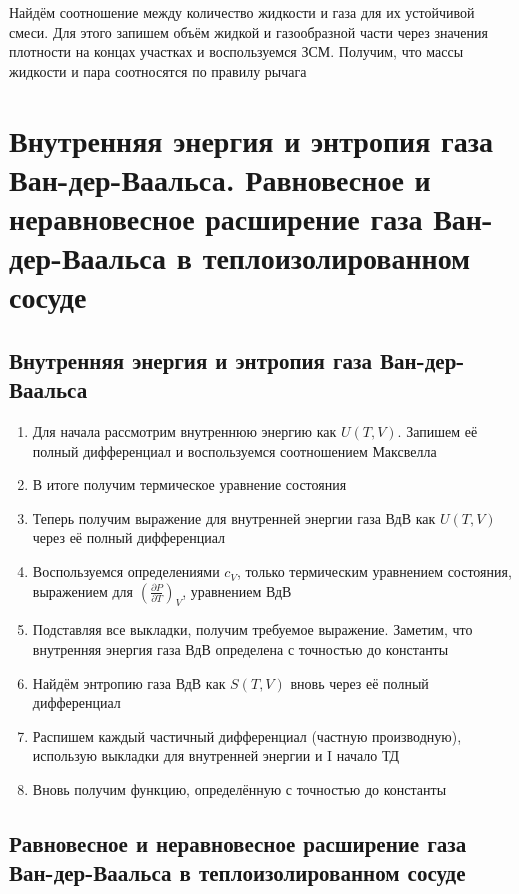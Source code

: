 \documentclass[a4paper, 14pt]{article}
\begin{document}
    Найдём соотношение между количество жидкости и газа для их устойчивой смеси.
    Для этого запишем объём жидкой и газообразной части через значения плотности на концах участках и воспользуемся ЗСМ.
    Получим, что массы жидкости и пара соотносятся по правилу рычага
    
    \section{Внутренняя энергия и энтропия газа Ван-дер-Ваальса.
    Равновесное и неравновесное расширение газа Ван-дер-Ваальса в теплоизолированном сосуде}
    
    \subsection{Внутренняя энергия и энтропия газа Ван-дер-Ваальса}
    
    \begin{enumerate}
        \item Для начала рассмотрим внутреннюю энергию как $U(T, V)$.
        Запишем её полный дифференциал и воспользуемся соотношением Максвелла
        \item В итоге получим термическое уравнение состояния
        \item Теперь получим выражение для внутренней энергии газа ВдВ как $U(T, V)$ через её полный дифференциал
        \item Воспользуемся определениями $c_V$, только термическим уравнением состояния, выражением для
        $(\frac{\partial P}{\partial T})_V$, уравнением ВдВ
        \item Подставляя все выкладки, получим требуемое выражение.
        Заметим, что внутренняя энергия газа ВдВ определена с точностью до константы
        \item Найдём энтропию газа ВдВ как $S(T, V)$ вновь через её полный дифференциал
        \item Распишем каждый частичный дифференциал (частную производную), использую выкладки для внутренней энергии
        и I начало ТД
        \item Вновь получим функцию, определённую с точностью до константы
    \end{enumerate}
    
    \subsection{Равновесное и неравновесное расширение газа Ван-дер-Ваальса в теплоизолированном сосуде}
    
\end{document}
